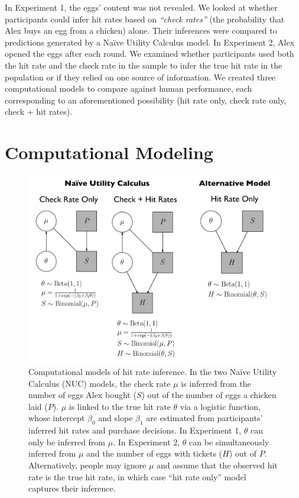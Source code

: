 \documentclass[10pt,letterpaper]{article}
\begin{document}
In Experiment 1, the eggs' content was not revealed. We looked at whether participants could infer hit rates based on \emph{``check rates''} (the probability that Alex buys an egg from a chicken) alone. Their inferences were compared to predictions generated by a Na\"ive Utility Calculus model. In Experiment 2, Alex opened the eggs after each round. We examined whether participants used both the hit rate and the check rate in the sample to infer the true hit rate in the population or if they relied on one source of information. We created three computational models to compare against human performance, each corresponding to an aforementioned possibility (hit rate only, check rate only, check + hit rates).

\section{Computational Modeling}

\begin{figure}[t]
  \centering
  \includegraphics[width=\linewidth]{model.png}
  \caption{Computational models of hit rate inference. In the two Na\"ive Utility Calculus (NUC) models, the check rate $\mu$ is inferred from the number of eggs Alex bought ($S$) out of the number of eggs a chicken laid ($P$). $\mu$ is linked to the true hit rate $\theta$ via a logistic function, whose intercept $\beta_0$ and slope $\beta_1$ are estimated from participants' inferred hit rates and purchase decisions. In Experiment 1, $\theta$ can only be inferred from $\mu$. In Experiment 2, $\theta$ can be simultaneously inferred from $\mu$ and the number of eggs with tickets ($H$) out of $P$. Alternatively, people may ignore $\mu$ and assume that the observed hit rate is the true hit rate, in which case ``hit rate only'' model captures their inference.}
  \label{fig:models}
\end{figure}
\end{document}
